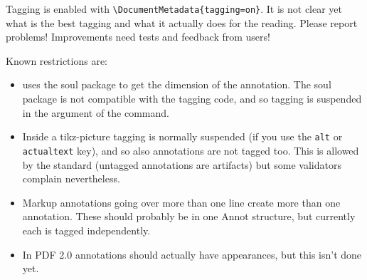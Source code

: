 \documentclass[a4paper]{ltxdoc}%
\begin{document}
Tagging is enabled with \verb+\DocumentMetadata{tagging=on}+.
It is not clear yet what is the best tagging and what it actually does for the reading.
Please report problems! Improvements need tests and feedback from users!

Known restrictions are:
\begin{itemize}
\item {} uses the soul package to get the dimension of the annotation. The soul package is not compatible with the tagging code, and so tagging is suspended in the argument of the command.
\item Inside a tikz-picture tagging is normally suspended (if you use the \texttt{alt} or \texttt{actualtext} key), and so also annotations are not tagged too. This is allowed by the standard (untagged annotations are artifacts) but some validators complain nevertheless.
\item Markup annotations going over more than one line create more than one annotation. These should probably be in one Annot structure, but currently each is tagged independently.
\item  In PDF 2.0 annotations should actually have appearances, but this isn't done yet.
\end{itemize}
\end{document}
